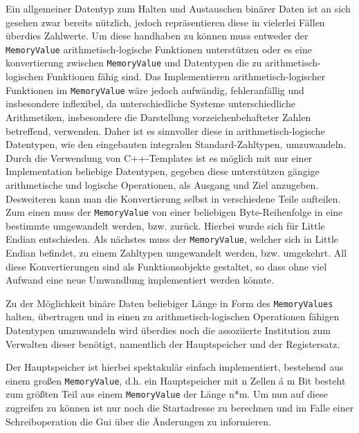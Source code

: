 Ein allgemeiner Datentyp zum Halten und Austauschen binärer Daten ist an sich
gesehen zwar bereits nützlich, jedoch repräsentieren diese in vielerlei Fällen
überdies Zahlwerte. Um diese handhaben zu können muss entweder der
\texttt{MemoryValue} arithmetisch-logische Funktionen unterstützen oder es eine
konvertierung zwischen \texttt{MemoryValue} und Datentypen die zu
arithmetisch-logischen Funktionen fähig sind. Das Implementieren
arithmetisch-logischer Funktionen im \texttt{MemoryValue} wäre jedoch aufwändig,
fehleranfällig und insbesondere inflexibel, da unterschiedliche Systeme
unterschiedliche Arithmetiken, insbesondere die Darstellung vorzeichenbehafteter
Zahlen betreffend, verwenden. Daher ist es sinnvoller diese in
arithmetisch-logische Datentypen, wie den eingebauten integralen
Standard-Zahltypen, umzuwandeln. Durch die Verwendung von C++-Templates ist es
möglich mit nur einer Implementation beliebige Datentypen, gegeben diese
unterstützen gängige arithmetische und logische Operationen, als Ausgang und
Ziel anzugeben. Desweiteren kann man die Konvertierung selbst in verschiedene
Teile aufteilen. Zum einen muss der \texttt{MemoryValue} von einer beliebigen
Byte-Reihenfolge in eine bestimmte umgewandelt werden, bzw. zurück. Hierbei
wurde sich für Little Endian entschieden. Als nächstes muss der
\texttt{MemoryValue}, welcher sich in Little Endian befindet, zu einem Zahltypen
umgewandelt werden, bzw. umgekehrt. All diese Konvertierungen sind als
Funktionsobjekte gestaltet, so dass ohne viel Aufwand eine neue Umwandlung
implementiert werden könnte.

Zu der Möglichkeit binäre Daten beliebiger Länge in Form des
\texttt{MemoryValues} halten, übertragen und in einen zu arithmetisch-logischen
Operationen fähigen Datentypen umzuwandeln wird überdies noch die assoziierte
Institution zum Verwalten dieser benötigt, namentlich der Hauptspeicher und der
Registersatz.

Der Hauptspeicher ist hierbei spektakulär einfach implementiert, bestehend aus
einem großen \texttt{MemoryValue}, d.h. ein Hauptspeicher mit n Zellen á m Bit
besteht zum größten Teil aus einem \texttt{MemoryValue} der Länge n*m. Um nun
auf diese zugreifen zu können ist nur noch die Startadresse zu berechnen und im
Falle einer Schreiboperation die Gui über die Änderungen zu informieren.

